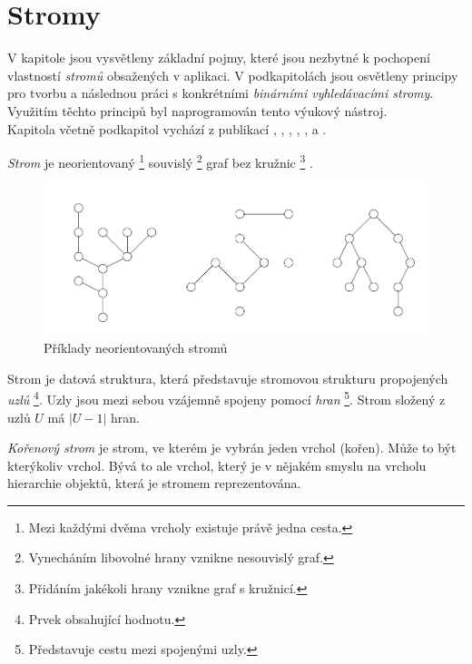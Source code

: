 \documentclass[
  biblatex=false,
  font=serif,
  glossaries=false,
  tables=false,
  theorems=false,
  index
]{kidiplom}
\begin{document}
\section{Stromy}
\indent \indent V kapitole jsou vysvětleny základní pojmy, které jsou nezbytné k pochopení vlastností \textit{stromů} obsažených v aplikaci. V podkapitolách jsou osvětleny principy pro tvorbu a následnou práci s konkrétními \textit{binárními vyhledávacími stromy}. Využitím těchto principů byl naprogramován tento výukový nástroj.\\ 
\indent Kapitola včetně podkapitol vychází z publikací \cite{belohlavekALM}, \cite{belohlavekVychodil}, \cite{vecerka}, \cite{dvorsky}, \cite{BinarySearch}, \cite{Adelson} a \cite{cormen}.


\begin{definition}[Strom]
\indent \textit{Strom} je neorientovaný \footnote{Mezi každými dvěma vrcholy existuje právě jedna cesta.} souvislý \footnote{Vynecháním libovolné hrany vznikne nesouvislý graf.} graf bez kružnic \footnote{Přidáním jakékoli hrany vznikne graf s kružnicí.} \cite{belohlavekALM}.
\end{definition}
\begin{figure}[h!]
\centering
	\includegraphics[scale=0.6]{obrazky/1Stromy.png}
	\caption{Příklady neorientovaných stromů}
\end{figure}

\medskip
\noindent Strom je datová struktura, která představuje stromovou strukturu propojených \textit{uzlů} \footnote{Prvek obsahující hodnotu.}. Uzly jsou mezi sebou vzájemně spojeny pomocí \textit{hran} \footnote{Představuje cestu mezi spojenými uzly.}. Strom složený z uzlů $U$ má $|U - 1|$ hran.


\begin{definition}
\indent \textit{Kořenový strom} je strom, ve kterém je vybrán jeden vrchol (kořen). Může to být kterýkoliv vrchol. Bývá to ale vrchol, který je v nějakém smyslu na vrcholu hierarchie objektů, která je stromem reprezentována.
\cite{belohlavekALM}
\end{definition}
\smallskip
\end{document}
